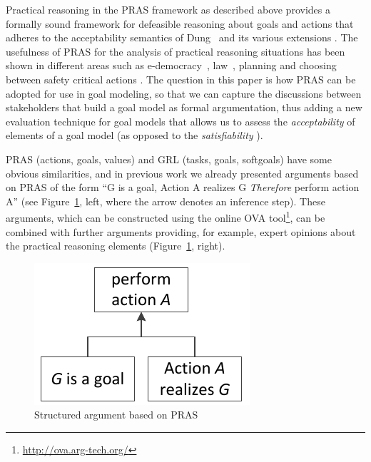 Practical reasoning in the PRAS framework as described above provides a formally sound framework for defeasible reasoning about goals and actions that adheres to the acceptability semantics of Dung~\cite{Dung95} and its various extensions \cite{amgoud2002reasoning, modgil2009}. The usefulness of PRAS for the analysis of practical reasoning situations has been shown in different areas such as e-democracy~\cite{cartwright2009IS}, law~\cite{atkinson2005legal}, planning \cite{medellin2013planning} and choosing between safety critical actions \cite{tolchinsky2012deliberation}. The question in this paper is how PRAS can be adopted for use in goal modeling, so that we can capture the discussions between stakeholders that build a goal model as formal argumentation, thus adding a new evaluation technique for goal models that allows us to assess the \emph{acceptability} of elements of a goal model (as opposed to the \emph{satisfiability} \cite{}). 

PRAS (actions, goals, values) and GRL (tasks, goals, softgoals) have some obvious similarities, and in previous work \cite{vanzee-etal:renext2015,vanZee-etal:er2016} we already presented arguments based on PRAS of the form ``G is a goal, Action A realizes G \emph{Therefore} perform action A'' (see Figure~\ref{fig:pras:example3}, left, where the arrow denotes an inference step). These arguments, which can be constructed using the online OVA tool\footnote{\url{http://ova.arg-tech.org/}}, can be combined with further arguments providing, for example, expert opinions about the practical reasoning elements (Figure~\ref{fig:pras:example3}, right).

\begin{figure}[ht]
\centering
\includegraphics[width=\columnwidth]{img/Fig3}
\caption{Structured argument based on PRAS}
\label{fig:pras:example3}
\end{figure}  


